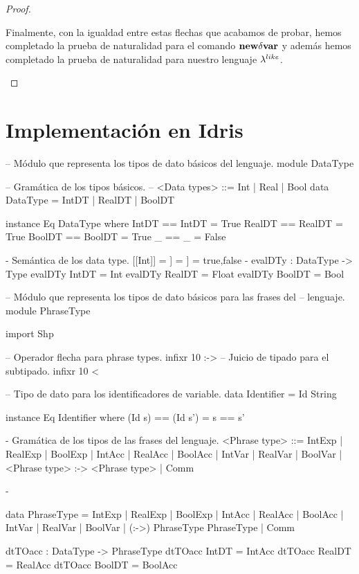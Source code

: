 \begin{proof}
\begin{itemize}
\begin{itemize}
\begin{itemize}
Finalmente, con la igualdad entre estas flechas que acabamos de probar, hemos completado
la prueba de naturalidad para el comando $\textbf{new} \delta \textbf{var}$ y adem\'as hemos completado
la prueba de naturalidad para nuestro lenguaje $\lambda^{like}$.
\end{itemize}
\end{itemize}
\end{itemize}
\end{proof}

\section{Implementaci\'on en Idris}

\begin{code}
-- Módulo que representa los tipos de dato básicos del lenguaje.
module DataType

-- Gramática de los tipos básicos.
-- <Data types> ::= Int | Real | Bool
data DataType = IntDT | RealDT | BoolDT

instance Eq DataType where
    IntDT  == IntDT  = True
    RealDT == RealDT = True
    BoolDT == BoolDT = True
    _ == _ = False

{- Semántica de los data type.
    [[Int]]  = \Z
    [[Real]] = \R
    [[Bool]] = {true,false}
-}
evalDTy : DataType -> Type
evalDTy IntDT  = Int
evalDTy RealDT = Float
evalDTy BoolDT = Bool

-- Módulo que representa los tipos de dato básicos para las frases del
-- lenguaje.
module PhraseType

import Shp

-- Operador flecha para phrase types.
infixr 10 :->
-- Juicio de tipado para el subtipado.
infixr 10 <~

-- Tipo de dato para los identificadores de variable.
data Identifier = Id String

instance Eq Identifier where
    (Id s) == (Id s') = s == s'

{- Gramática de los tipos de las frases del lenguaje.
   <Phrase type> ::= IntExp | RealExp | BoolExp
                  |  IntAcc | RealAcc | BoolAcc
                  |  IntVar | RealVar | BoolVar
                  |  <Phrase type> :-> <Phrase type>
                  |  Comm

-}
data PhraseType = IntExp | RealExp | BoolExp 
                | IntAcc | RealAcc | BoolAcc
                | IntVar | RealVar | BoolVar
                | (:->) PhraseType PhraseType
                | Comm

dtTOacc : DataType -> PhraseType
dtTOacc IntDT  = IntAcc
dtTOacc RealDT = RealAcc
dtTOacc BoolDT = BoolAcc


\end{code}
